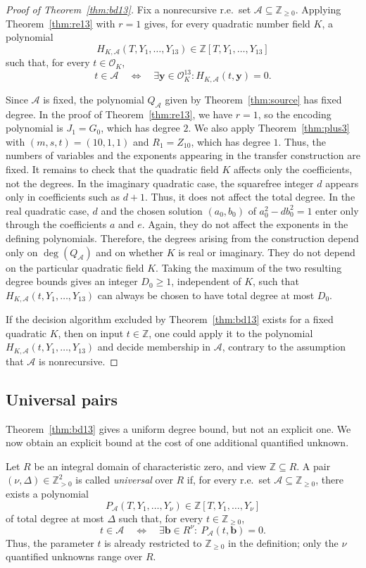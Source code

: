 \documentclass[12pt]{amsart}
\numberwithin{equation}{section}
\theoremstyle{remark}
\theoremstyle{plain}
\newcommand{\Z}{\mathbb{Z}}
\newcommand{\sO}{\mathcal{O}}
\newcommand{\sA}{\mathcal{A}}
\newcommand{\by}{\mathbf{y}}
\newcommand{\bb}{\mathbf{b}}
\begin{document}
\begin{proof}[Proof of Theorem~\ref{thm:bd13}]
Fix a nonrecursive r.e.\ set $\sA\subseteq\Z_{\geq0}$. Applying Theorem~\ref{thm:re13} with $r=1$ gives, for every quadratic number field $K$, a polynomial
\[
H_{K,\sA}(T,Y_1,\ldots,Y_{13})\in\Z[T,Y_1,\ldots,Y_{13}]
\]
such that, for every $t\in\sO_K$,
\[
t\in \sA\quad\Longleftrightarrow\quad
\exists\by\in\sO_K^{13}: H_{K,\sA}(t,\by)=0.
\]

Since $\sA$ is fixed, the polynomial $Q_{\sA}$ given by Theorem~\ref{thm:source} has fixed degree. In the proof of Theorem~\ref{thm:re13}, we have $r=1$, so the encoding polynomial is $J_1=G_0$, which has degree $2$. We also apply Theorem~\ref{thm:plus3} with $(m,s,t)=(10,1,1)$ and $R_1=Z_{10}$, which has degree $1$. Thus, the numbers of variables and the exponents appearing in the transfer construction are fixed. It remains to check that the quadratic field $K$ affects only the coefficients, not the degrees. In the imaginary quadratic case, the squarefree integer $d$ appears only in coefficients such as $d+1$. Thus, it does not affect the total degree. In the real quadratic case, $d$ and the chosen solution $(a_0,b_0)$ of $a_0^2-db_0^2=1$ enter only through the coefficients $a$ and $e$. Again, they do not affect the exponents in the defining polynomials. Therefore, the degrees arising from the construction depend only on $\deg(Q_{\sA})$ and on whether $K$ is real or imaginary. They do not depend on the particular quadratic field $K$. Taking the maximum of the two resulting degree bounds gives an integer $D_0\geq1$, independent of $K$, such that $H_{K,\sA}(t,Y_1,\ldots,Y_{13})$ can always be chosen to have total degree at most $D_0$.

If the decision algorithm excluded by Theorem~\ref{thm:bd13} exists for a fixed quadratic $K$, then on input $t\in\Z$, one could apply it to the polynomial $H_{K,\sA}(t,Y_1,\ldots,Y_{13})$ and decide membership in $\sA$, contrary to the assumption that $\sA$ is nonrecursive.
\end{proof}

\subsection{Universal pairs}
Theorem~\ref{thm:bd13} gives a uniform degree bound, but not an explicit one. We now obtain an explicit bound at the cost of one additional quantified unknown.

Let $R$ be an integral domain of characteristic zero, and view $\Z\subseteq R$. A pair $(\nu,\Delta)\in\Z_{>0}^2$ is called \emph{universal} over $R$ if, for every r.e.\ set $\sA\subseteq\Z_{\geq0}$, there exists a polynomial
\[
P_{\sA}(T,Y_1,\ldots,Y_\nu)\in\Z[T,Y_1,\ldots,Y_\nu]
\]
of total degree at most $\Delta$ such that, for every $t\in\Z_{\geq0}$,
\[
t\in\sA\quad\Longleftrightarrow\quad\exists\bb\in R^\nu\colon\ P_{\sA}(t,\bb)=0.
\]
Thus, the parameter $t$ is already restricted to $\Z_{\geq0}$ in the definition; only the $\nu$ quantified unknowns range over $R$.
\end{document}
